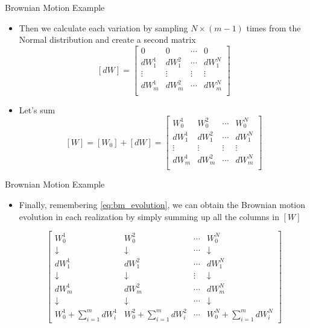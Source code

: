 \documentclass{beamer}
\begin{document}
\begin{frame}{Brownian Motion Example}
\begin{itemize}
    \item Then we calculate each variation by sampling $N\times (m-1)$ times from the Normal distribution and create a second matrix 
    $$
    [dW] =
    \begin{bmatrix}
    0 & 0 & \cdots & 0 \\
    dW^1_1 & dW^2_1 & \cdots & dW^N_1 \\
    \vdots & \vdots & \vdots & \vdots \\
    dW^1_{m} & dW^2_{m} & \cdots & dW^N_{m} \\
    \end{bmatrix}
    $$  
    \item Let's sum 
    $$[W] = [W_0] + [dW] =
    \begin{bmatrix}
    W^1_0 & W^2_0 & \cdots & W^N_0 \\
    dW^1_1 & dW^2_1 & \cdots & dW^N_1 \\
    \vdots & \vdots & \vdots & \vdots \\
    dW^1_{m} & dW^2_{m} & \cdots & dW^N_{m} \\
    \end{bmatrix}
    $$  
\end{itemize}
\end{frame}

\begin{frame}{Brownian Motion Example}
\begin{itemize}
    \item Finally, remembering \cref{eq:bm_evolution}, we can obtain the Brownian motion evolution in each realization by simply summing up all the columns in $[W]$

\[\left[
\begin{array}{cccc}
W^1_0 & W^2_0 & \cdots & W^N_0 \\
\downarrow & \downarrow & \cdots & \downarrow \\
dW^1_1 & dW^2_1 & \cdots & dW^N_1 \\
\downarrow & \downarrow & \vdots & \downarrow \\
dW^1_{m} & dW^2_{m} & \cdots & dW^N_{m} \\
\downarrow & \downarrow & \cdots & \downarrow \\
W^1_0+\sum\limits_{i=1}^{m} dW^1_i & W^2_0+\sum\limits_{i=1}^{m} dW^2_i & \cdots & W^N_0+\sum\limits_{i=1}^{m} dW^N_i
\end{array}\right]
\]
\end{itemize}
\end{frame}
\end{document}
